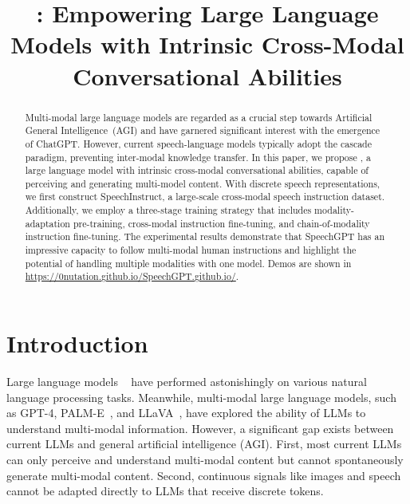 \title{\Large\method: Empowering Large Language Models with Intrinsic Cross-Modal Conversational Abilities}



\maketitle

\begin{abstract}

Multi-modal large language models are regarded as a crucial step towards Artificial General Intelligence~(AGI) and have garnered significant interest with the emergence of ChatGPT. However, current speech-language models typically adopt the cascade paradigm, preventing inter-modal knowledge transfer. In this paper, we propose \method, a 
large language model with
intrinsic cross-modal conversational abilities, capable of perceiving and generating multi-model content. With discrete speech representations, we first construct SpeechInstruct, a large-scale cross-modal speech instruction dataset. Additionally, we employ a three-stage training strategy that includes modality-adaptation pre-training, cross-modal instruction fine-tuning, and chain-of-modality instruction fine-tuning. The experimental results demonstrate that SpeechGPT has an impressive capacity to follow multi-modal human instructions and highlight the potential of handling multiple modalities with one model. Demos are shown in \url{https://0nutation.github.io/SpeechGPT.github.io/}.\end{abstract}

\section{Introduction}

Large language models ~\citep{openai2023gpt4, touvron2023llama} have performed astonishingly on various natural language processing tasks. Meanwhile, multi-modal large language models, such as GPT-4, PALM-E~\citep{driess2023palm}, and LLaVA~\citep{liu2023visual}, have explored the ability of LLMs to understand multi-modal information. 
However, a significant gap exists between current LLMs and general artificial intelligence (AGI). First, most current LLMs can only perceive and understand multi-modal content but cannot spontaneously generate multi-modal content. Second, continuous signals like images and speech cannot be adapted directly to LLMs that receive discrete tokens.

